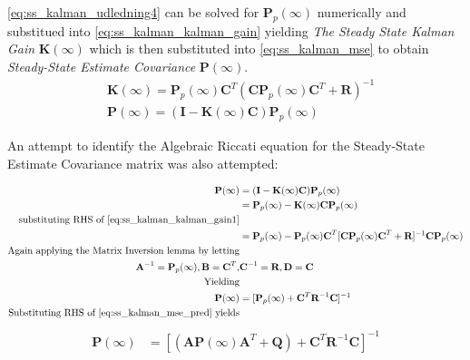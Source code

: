 \cref{eq:ss_kalman_udledning4} can be solved for $\textbf{P}_p(\infty)$ numerically and substitued into \cref{eq:ss_kalman_kalman_gain} yielding \textit{The Steady State Kalman Gain} $ \textbf{K}(\infty) $ which is then substituted into \cref{eq:ss_kalman_mse} to obtain \textit{Steady-State Estimate Covariance} $ \textbf{P}(\infty) $.
\begin{align}
	& \textbf{K}(\infty) = \textbf{P}_p(\infty) \textbf{C}^T (\textbf{C} \textbf{P}_p	(\infty) \textbf{C}^T + \textbf{R})^{-1} \label{eq:ss_kalman_kalman_gain1} \\
	& \textbf{P}(\infty) = (\textbf{I} - \textbf{K}(\infty) \textbf{C}) \textbf{P}_p(\infty) \label{eq:ss_kalman_mse1} 
\end{align}

An attempt to identify the Algebraic Riccati equation for the Steady-State Estimate Covariance matrix was also attempted:


\begin{equation}
	\begin{split}\label{eq:ss_kalman_udledning5}
	 	\textbf{P}(\infty) 	& = (\textbf{I} - \textbf{K}(\infty) \textbf{C}) \textbf{P}_p(\infty) \\ %
		& = \textbf{P}_p(\infty) - \textbf{K}(\infty) \textbf{C}\textbf{P}_p(\infty) \\
		\text{substituting RHS of \cref{eq:ss_kalman_kalman_gain1}} \\
		& = \textbf{P}_p(\infty) - \textbf{P}_p(\infty) \textbf{C}^T [\textbf{C} \textbf{P}_p	(\infty) \textbf{C}^T + \textbf{R}]^{-1}\textbf{C}\textbf{P}_p(\infty) \\
		\text{Again applying the Matrix Inversion lemma by letting} \\
		\textbf{A}^{-1} = \textbf{P}_p(\infty), \textbf{B} = \textbf{C}^T, &\textbf{C}^{-1} = \textbf{R}, \textbf{D} = \textbf{C} \\
		\text{Yielding} \\
		\textbf{P}(\infty) 	& = [\textbf{P}_p(\infty) + \textbf{C}^T\textbf{R}^{-1}\textbf{C}]^{-1} \\
		\text{Substituting RHS of \cref{eq:ss_kalman_mse_pred} yields}  \\
	\end{split}
\end{equation}
\begin{align}
		\textbf{P}(\infty) & = [(\textbf{A}\textbf{P}(\infty)\textbf{A}^T + \textbf{Q}) + \textbf{C}^T\textbf{R}^{-1}\textbf{C}]^{-1}  \label{eq:ss_kalman_udledning6}
\end{align}


